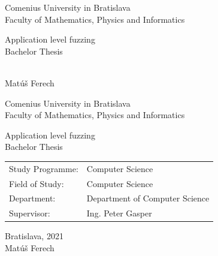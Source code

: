 \documentclass[12pt, twoside]{book}
\def\mfrok{2021}
\def\mfnazov{Application level fuzzing}
\def\mftyp{Bachelor Thesis}
\def\mfautor{Matúš Ferech}
\def\mfskolitel{Ing. Peter Gasper}
\def\mfmiesto{Bratislava, \mfrok}
\def\mfodbor{Computer Science}
\def\program{Computer Science }
\def\mfpracovisko{Department of Computer Science}
\begin{document}
\frontmatter


\thispagestyle{empty}

\begin{center}
  \sc\large
  Comenius University in Bratislava\\
  Faculty of Mathematics, Physics and Informatics

\vfill

{\LARGE\mfnazov}\\
\mftyp
\end{center}

\vfill

{\sc\large
\noindent \mfrok\\
\mfautor
}

\cleardoublepage


\thispagestyle{empty}
\noindent

\begin{center}
\sc
\large
  Comenius University in Bratislava\\
  Faculty of Mathematics, Physics and Informatics

\vfill

{\LARGE\mfnazov}\\
\mftyp
\end{center}

\vfill

\noindent
\begin{tabular}{ll}
Study Programme: & \program \\
Field of Study: & \mfodbor \\
Department: & \mfpracovisko \\
Supervisor: & \mfskolitel \\
\end{tabular}

\vfill


\noindent \mfmiesto\\
\mfautor

\cleardoublepage


\end{document}
